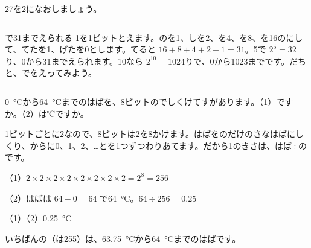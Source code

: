 \begin{jibun}
27を2になおしましょう。
\end{jibun}

\begin{column}{で31までえられる}
1を1ビットとえます。のを1、しを2、を4、を8、を16のにして、てたを1、げたを0とします。てると $16+8+4+2+1=31$。5で $2^5=32$り、0から31までえられます。10なら $2^{10}=1024$りで、0から1023までです。だちと、でをえってみよう。
\end{column}

\begin{reidai}[ビットの\R{数}{かず}と1\R{段階}{だん|かい}の\R{大}{おお}きさ]
\qty{0}{\degreeCelsius}から\qty{64}{\degreeCelsius}までのはばを、8ビットのでしくけてすがあります。（1）\nobreak {}ですか。（2）は℃ですか。\par
\kangaekata 1ビットごとに2なので、8ビットは2を8かけます。はばをのだけのさなはばにしくり、からに0、1、2、…とを1つずつわりあてます。だから1のきさは、はば÷のです。\par
\shiki （1）\nobreak $2\times2\times2\times2\times2\times2\times2\times2=2^8=256$\par
\hspace*{2.6\zw}（2）\nobreak はばは $64-0=64$ で\qty{64}{\degreeCelsius}。$64\div256=0.25$\par
\kotae （1）\quad（2）\nobreak \qty{0.25}{\degreeCelsius}\par
{\small いちばんの（は255）は、\qty{63.75}{\degreeCelsius}から\qty{64}{\degreeCelsius}までのはばです。}
\end{reidai}

